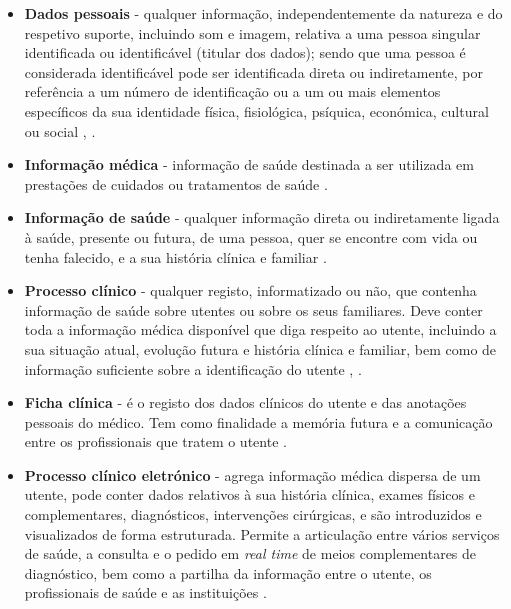 \documentclass[conference]{IEEEtran}
\begin{document}
\begin{itemize}

	\item \textbf{Dados pessoais} - qualquer informação, independentemente da natureza e do respetivo suporte, incluindo som e imagem, relativa a uma pessoa singular identificada ou identificável (titular dos dados); sendo que uma pessoa é considerada identificável pode ser identificada direta ou indiretamente, por referência a um número de identificação ou a um ou mais elementos específicos da sua identidade física, fisiológica, psíquica, económica, cultural ou social \cite{parecerERS2015}, \cite{CNPDinfsaude2014}.
	
	\item \textbf{Informação médica} - informação de saúde destinada a ser utilizada em prestações de cuidados ou tratamentos de saúde \cite{regulamentodeonmedic}.
	
	\item \textbf{Informação de saúde} - qualquer informação direta ou indiretamente ligada à saúde, presente ou futura, de uma pessoa, quer se encontre com vida ou tenha falecido, e a sua história clínica e familiar \cite{consolidacaoinfsaude}.
	
	\item \textbf{Processo clínico} - qualquer registo, informatizado ou não, que contenha informação de saúde sobre utentes ou sobre os seus familiares. Deve conter toda a informação médica disponível que diga respeito ao utente, incluindo a sua situação atual, evolução futura e história clínica e familiar, bem como de informação suficiente sobre a identificação do utente \cite{regulamentodeonmedic}, \cite{parecerERS2015}. 
	
	\item \textbf{Ficha clínica} - é o registo dos dados clínicos do utente e das anotações pessoais do médico. Tem como finalidade a memória futura e a comunicação entre os profissionais que tratem o utente \cite{regulamentodeonmedic}.
	
	\item \textbf{Processo clínico eletrónico} - agrega informação médica dispersa de um utente, pode conter dados relativos à sua história clínica, exames físicos e complementares, diagnósticos, intervenções cirúrgicas, e são introduzidos e visualizados de forma estruturada. Permite a articulação entre vários serviços de saúde, a consulta e o pedido em \textit{real time} de meios complementares de diagnóstico, bem como a partilha da informação entre o utente, os profissionais de saúde e as instituições \cite{CNPDinfsaude2014}.
	

\end{itemize}
\end{document}
